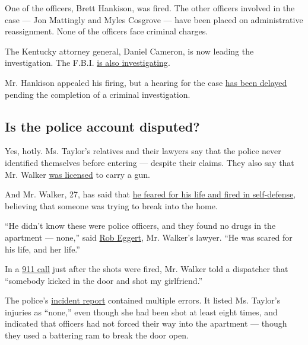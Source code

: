 One of the officers, Brett Hankison, was fired. The other officers
involved in the case --- Jon Mattingly and Myles Cosgrove --- have been
placed on administrative reassignment. None of the officers face
criminal charges.

The Kentucky attorney general, Daniel Cameron, is now leading the
investigation. The F.B.I.
\href{https://www.nytimes3xbfgragh.onion/2020/05/21/us/fbi-louisville-shooting.html}{is
also investigating}.

Mr. Hankison appealed his firing, but a hearing for the case
\href{https://www.wdrb.com/news/appeal-delayed-for-fired-lmpd-officer-involved-in-breonna-taylor-raid/article_bf3e5ea8-c602-11ea-9ce8-db2edd607e3a.html}{has
been delayed} pending the completion of a criminal investigation.

\hypertarget{is-the-police-account-disputed}{%
\subsection{Is the police account
disputed?}\label{is-the-police-account-disputed}}

Yes, hotly. Ms. Taylor's relatives and their lawyers say that the police
never identified themselves before entering --- despite their claims.
They also say that Mr. Walker
\href{https://www.nytimes3xbfgragh.onion/2020/05/14/us/breonna-taylor-louisville-shooting.html}{was
licensed} to carry a gun.

And Mr. Walker, 27, has said that
\href{https://www.courier-journal.com/story/news/crime/2020/05/13/breonna-taylor-lawyer-says-louisville-police-need-to-get-story-straight/5183137002/}{he
feared for his life and fired in self-defense}, believing that someone
was trying to break into the home.

``He didn't know these were police officers, and they found no drugs in
the apartment --- none,'' said
\href{https://www.nytimes3xbfgragh.onion/2020/05/22/us/Breonna-Taylor-Kenneth-Walker.html}{Rob
Eggert}, Mr. Walker's lawyer. ``He was scared for his life, and her
life.''

In a
\href{https://www.nytimes3xbfgragh.onion/2020/05/29/us/louisville-protest-shooting-breonna-taylor.html}{911
call} just after the shots were fired, Mr. Walker told a dispatcher that
``somebody kicked in the door and shot my girlfriend.''

The police's
\href{https://www.scribd.com/document/465105285/Breonna-Taylor-Incident-Report\#from_embed?campaign=SkimbitLtd\&ad_group=1025X1162200X37e14a5d9156059be0d5da4023a17e62\&keyword=660149026\&source=hp_affiliate\&medium=affiliate}{incident
report} contained multiple errors. It listed Ms. Taylor's injuries as
``none,'' even though she had been shot at least eight times, and
indicated that officers had not forced their way into the apartment ---
though they used a battering ram to break the door open.

